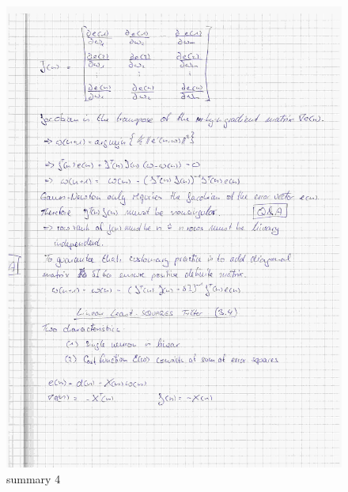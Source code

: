 \documentclass[paper=a4, fontsize=11pt]{scrartcl} %
\numberwithin{equation}{section} %
\numberwithin{figure}{section} %
\numberwithin{table}{section} %
\begin{document}
\begin{figure}[ht]
	\centering
  \includegraphics[width=0.7\textheight]{07.jpg}
	\caption{summary 4}
	\label{fig4}
\end{figure}
\end{document}

